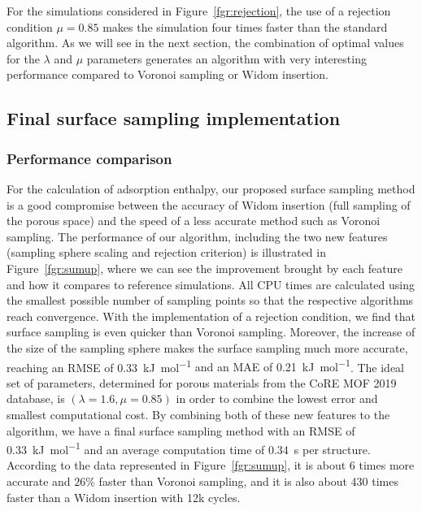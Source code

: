 \documentclass[main]{subfiles}
\begin{document}
For the simulations considered in Figure~\ref{fgr:rejection}, the use of a rejection condition $\mu = 0.85$ makes the simulation four times faster than the standard algorithm. As we will see in the next section, the combination of optimal values for the $\lambda$ and $\mu$ parameters generates an algorithm with very interesting performance compared to Voronoi sampling or Widom insertion.


\subsection{Final surface sampling implementation}\label{sct:final_sampling}

\subsubsection{Performance comparison}

For the calculation of adsorption enthalpy, our proposed surface sampling method is a good compromise between the accuracy of Widom insertion (full sampling of the porous space) and the speed of a less accurate method such as Voronoi sampling. The performance of our algorithm, including the two new features (sampling sphere scaling and rejection criterion) is illustrated in Figure~\ref{fgr:sumup}, where we can see the improvement brought by each feature and how it compares to reference simulations. All CPU times are calculated using the smallest possible number of sampling points so that the respective algorithms reach convergence. With the implementation of a rejection condition, we find that surface sampling is even quicker than Voronoi sampling. Moreover, the increase of the size of the sampling sphere makes the surface sampling much more accurate, reaching an RMSE of \SI{0.33}{\kilo\joule\per\mole} {and an MAE of \SI{0.21}{\kilo\joule\per\mole}}. The ideal set of parameters, determined for porous materials from the CoRE MOF 2019 database, is $(\lambda = 1.6, \mu = 0.85)$ in order to combine the lowest error and smallest computational cost. By combining both of these new features to the algorithm, we have a final surface sampling method with an RMSE of \SI{0.33}{\kilo\joule\per\mole} and an average computation time of \SI{0.34}{\second} per structure. According to the data represented in Figure~\ref{fgr:sumup}, it is about 6 times more accurate and {$26$\%} faster than Voronoi sampling, and it is also about 430 times faster than a Widom insertion with 12k cycles.
\end{document}
